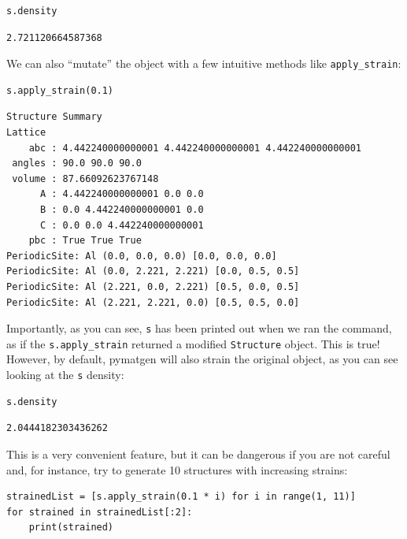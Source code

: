 \begin{verbatim}
s.density
\end{verbatim}

\begin{verbatim}
2.721120664587368
\end{verbatim}

We can also ``mutate'' the object with a few intuitive methods like
\texttt{apply\_strain}:

\begin{verbatim}
s.apply_strain(0.1)
\end{verbatim}

\begin{verbatim}
Structure Summary
Lattice
    abc : 4.442240000000001 4.442240000000001 4.442240000000001
 angles : 90.0 90.0 90.0
 volume : 87.66092623767148
      A : 4.442240000000001 0.0 0.0
      B : 0.0 4.442240000000001 0.0
      C : 0.0 0.0 4.442240000000001
    pbc : True True True
PeriodicSite: Al (0.0, 0.0, 0.0) [0.0, 0.0, 0.0]
PeriodicSite: Al (0.0, 2.221, 2.221) [0.0, 0.5, 0.5]
PeriodicSite: Al (2.221, 0.0, 2.221) [0.5, 0.0, 0.5]
PeriodicSite: Al (2.221, 2.221, 0.0) [0.5, 0.5, 0.0]
\end{verbatim}

Importantly, as you can see, \texttt{s} has been
printed out when we ran the command, as if the
\texttt{s.apply\_strain} returned a modified
\texttt{Structure} object. This is true! However, by
default, pymatgen will also strain the original object, as you can see
looking at the \texttt{s} density:

\begin{verbatim}
s.density
\end{verbatim}

\begin{verbatim}
2.0444182303436262
\end{verbatim}

This is a very convenient feature, but it can be dangerous if you are
not careful and, for instance, try to generate 10 structures with
increasing strains:

\begin{verbatim}
strainedList = [s.apply_strain(0.1 * i) for i in range(1, 11)]
for strained in strainedList[:2]:
    print(strained)
\end{verbatim}

